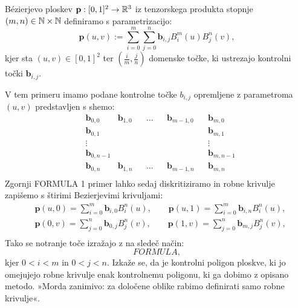 \documentclass[a4paper,12pt]{article}
\begin{document}
\begin{definicija}
    Bézierjevo ploskev $\mathbf{p} : [0,1]^2 \rightarrow \mathbb{R}^3$ iz tenzorskega produkta stopnje 
    $(m, n) \in \mathbb{N} \times \mathbb{N}$ definiramo s parametrizacijo:
    $$\mathbf{p}(u,v) := \sum_{i=0}^m \sum_{j=0}^n \mathbf{b}_{i,j} B_i^m(u)B_j^n(v),$$
    kjer sta $(u,v) \in [0,1]^2$ ter $(\frac{i}{m}, \frac{j}{n})$
    domenske točke, ki ustrezajo kontrolni točki $\mathbf{b}_{i,j}$.
\end{definicija}


V tem primeru imamo podane kontrolne točke $b_{i,j}$ opremljene z 
parametroma $(u,v)$ predstavljen s shemo: 
\begin{align*}
    &\mathbf{b}_{0,0} &\mathbf{b}_{1,0} & &\ldots & &\mathbf{b}_{m-1,0} & &\mathbf{b}_{m,0} \\
    &\mathbf{b}_{0,1}  &  & &  & &  & &\mathbf{b}_{m,1} \\
    &\vdots  &  &  & &  & & &\vdots\\
    &\mathbf{b}_{0,n-1}  &  &  & &  & &  &\mathbf{b}_{m,n-1} \\ 
    &\mathbf{b}_{0,n} &\mathbf{b}_{1,n} & &\ldots & &\mathbf{b}_{m-1,n} & &\mathbf{b}_{m,n} \\
\end{align*}
Zgornji FORMULA 1 primer lahko sedaj diskritiziramo in robne krivulje zapišemo s štirimi 
Bezierjevimi krivuljami:
\begin{align*}
    &\mathbf{p}(u,0) =\sum_{i=0}^m \mathbf{b}_{i,0} B_i^n(u), \qquad
    \mathbf{p}(u,1) =\sum_{i=0}^m \mathbf{b}_{i,n} B_i^n(u),  \\
    &\mathbf{p}(0,v) =\sum_{j=0}^n \mathbf{b}_{0,j} B_j^n(v), \qquad
    \mathbf{p}(1,v) =\sum_{j=0}^n \mathbf{b}_{m,j} B_j^n(v),  \\
 \end{align*}
Tako se notranje toče izražajo z na sledeč način: 
$$FORMULA,$$
kjer $0 < i < m$ in $0< j <n$. Izkaže se, da je kontrolni poligon ploskve, 
ki jo omejujejo robne krivulje enak kontrolnemu poligonu, ki ga dobimo z opisano metodo. 
»Morda zanimivo: za določene oblike rabimo definirati samo robne krivulje«.
\end{document}
